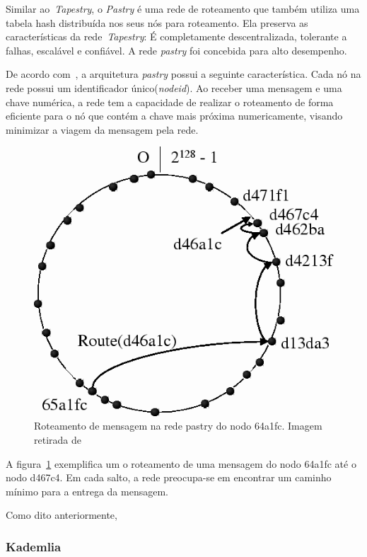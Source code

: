 Similar ao~\emph{Tapestry}, o \emph{Pastry} é uma rede de roteamento que também utiliza uma tabela hash distribuída nos seus nós para roteamento. Ela preserva as características da rede~\emph{Tapestry}: É completamente descentralizada, tolerante a falhas, escalável e confiável. A rede \emph{pastry} foi concebida para alto desempenho.

De acordo com~\cite{rowstron01}, a arquitetura \emph{pastry} possui a seguinte característica. Cada nó na rede possui um identificador único(\emph{nodeid}). Ao receber uma mensagem e uma chave numérica, a rede tem a capacidade de realizar o roteamento de forma eficiente para o nó que contém a chave mais próxima numericamente, visando minimizar a viagem da mensagem pela rede.

\begin{figure}
	\centering
	\includegraphics[scale=0.5]{images/roteamento-pastry.png}
	\caption{Roteamento de mensagem na rede pastry do nodo 64a1fc. Imagem retirada de~\cite{rowstron01}}
	\label{fig:roteamento-pastry}
\end{figure}

A figura~\ref{fig:roteamento-pastry} exemplifica um o roteamento de uma mensagem do nodo 64a1fc até o nodo d467c4. Em cada salto, a rede preocupa-se em encontrar um caminho mínimo para a entrega da mensagem.

Como dito anteriormente, 

\subsubsection{Kademlia}

